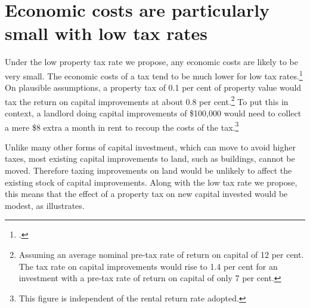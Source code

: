 \documentclass[twoside,english]{grattanBudgetRepairb5portrait}
\begin{document}
\section{\label{sec:PROP-4-3}Economic costs are particularly small with low tax rates}
Under the low property tax rate we propose, any economic costs are likely to be very small. The economic costs of a tax tend to be much lower for low tax rates.\footcite[][18]{KPMGEconotech2011-GST}  On plausible assumptions, a property tax of 0.1 per cent of property value would tax the return on capital improvements at about 0.8 per cent.\footnote{Assuming an average nominal pre-tax rate of return on capital of 12 per cent. The tax rate on capital improvements would rise to 1.4 per cent for an investment with a pre-tax rate of return on capital of only 7 per cent.}  To put this in context, a landlord doing capital improvements of \$100,000 would need to collect a mere \$8 extra a month in rent to recoup the costs of the tax.\footnote{This figure is independent of the rental return rate adopted.}

Unlike many other forms of capital investment, which can move to avoid higher taxes, most existing capital improvements to land, such as buildings, cannot be moved. Therefore taxing improvements on land would be unlikely to affect the existing stock of capital improvements. Along with the low tax rate we propose, this means that the effect of a property tax on new capital invested would be modest, as  illustrates.  
\end{document}
